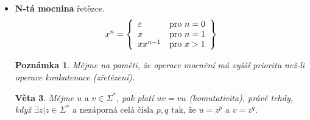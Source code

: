 \documentclass[10pt, a4paper, titlepage]{article}
\theoremstyle{note}
\newtheorem{veta}{Věta}
\newtheorem{poznamka}{Poznámka}
\begin{document}
\begin{itemize}
\begin{itemize}
\item
\textbf{Infix} řetězce. Označme jej $Ifx(x) = \lbrace y | \exists z_{1}, z_{2} \text{ tak, že } z_{1}yz_{2} = x \rbrace$.

\item
\textbf{Sufix} řetězce. Označme jej $Sfx(x) = \lbrace y | \exists z \text{ tak, že } zy = x \rbrace$.
\end{itemize}

\begin{veta}
\begin{gather*}
xy = xz \: \Longrightarrow \: y = z \\
yx = zx \: \Longrightarrow \: y = z
\end{gather*}
Algebraicky je operace zapsána jako $\langle \Sigma^{*}, \cdot, \varepsilon \rangle$.
\end{veta}

\begin{veta}
Vyslovme předpoklad, že platí $xy = uv$. Pak platí právě jedno z těchto tvrzení:
\begin{gather*}
x = u, y = v \\
|x| > |u| \text{ a } \exists w| w \neq \varepsilon, \text{ tak že } x = uw \text{ a } v = wy \\
|x| < |u| \text{ a } \exists w| w \neq \varepsilon, \text{ tak že } u = xw \text{ a } y = wv
\end{gather*}
\end{veta}

\item
\textbf{N-tá mocnina} řetězce.
$$
x^{n} = \left\lbrace
\begin{array}{l l}
\varepsilon & \text{pro } n=0 \\
x & \text{pro } n=1 \\
xx^{n-1} & \text{pro } x>1 \\
\end{array}
\right\rbrace
$$

\begin{poznamka}
Mějme na paměti, že operace mocnění má vyšší prioritu než-li operace konkatenace (zřetězení).
\end{poznamka}

\begin{veta}
Mějme $u \text{ a } v \in \Sigma^{*}$, pak platí $uv = vu$ (komutativita), právě
tehdy, když $\exists z| z \in \Sigma^{*} \text{ a nezáporná celá čísla } p, q \text{ tak, že } u = z^{p} \text{ a } v=z^{q}$.
\end{veta}


\end{itemize}
\end{document}
